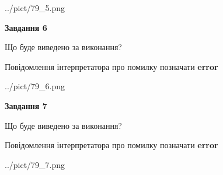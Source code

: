 \documentclass[10pt, ukrainian]{article}
\begin{document}
{\begin {large}
\begin{center}
	{../pict/79_5.png}
\end{center}
\newpage

{\begin {center}\textbf{Завдання 6}\end {center}}\par
Що буде виведено за виконання? \par
Повідомлення інтерпретатора про помилку позначати \textbf{error}

\begin{center}
	{../pict/79_6.png}
\end{center}
\newpage

{\begin {center}\textbf{Завдання 7}\end {center}}\par
Що буде виведено за виконання? \par
Повідомлення інтерпретатора про помилку позначати \textbf{error}

\begin{center}
	{../pict/79_7.png}
\end{center}
\newpage

\end {large}}
\end{document}
